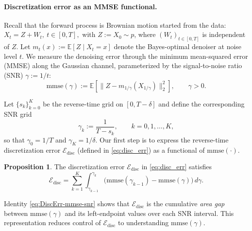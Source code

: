 \documentclass[11pt]{article}
\theoremstyle{definition}
\newtheorem{proposition}{Proposition}
\newcommand{\E}{\mathbb{E}}
\numberwithin{equation}{section}
\begin{document}





\paragraph{Discretization error as an MMSE functional.}
Recall that the forward process is Brownian motion started from the data:
\(
X_t = Z + W_t,\ t\in[0,T],
\)
with $Z:=X_0\sim p$, where $(W_t)_{t\in[0,T]}$ is independent of $Z$. 
Let
\(
m_t(x) := \E[Z\mid X_t=x]
\)
denote the Bayes-optimal denoiser at noise level $t$.
We measure the denoising error through the minimum mean-squared error (MMSE) along the Gaussian channel,
parameterized by the signal-to-noise ratio (SNR) $\gamma := 1/t$:
\begin{equation*}
\mathrm{mmse}(\gamma) := \E\!\left[\|Z - m_{1/\gamma}(X_{1/\gamma})\|_2^2\right],\qquad \gamma>0.
\end{equation*}

Let $\{s_k\}_{k=0}^K$ be the reverse-time grid on $[0,T-\delta]$ and define the corresponding SNR grid
\begin{equation*}
\gamma_k := \frac{1}{T-s_k},\qquad k=0,1,\dots,K,
\end{equation*}
so that $\gamma_0=1/T$ and $\gamma_K = 1/\delta$.
Our first step is to express the reverse-time discretization error $\mathcal E_{\mathrm{disc}}$ (defined in \eqref{eq:disc_err})
as a functional of $\mathrm{mmse}(\cdot)$.

\begin{proposition}\label{thm:disc-mmse}
The discretization error $\mathcal E_{\mathrm{disc}}$ in \eqref{eq:disc_err} satisfies
\begin{equation}\label{eq:DiscErr-mmse-snr}
\mathcal E_{\mathrm{disc}}
=
\sum_{k=1}^K
\int_{\gamma_{k-1}}^{\gamma_k}
\big(\mathrm{mmse}(\gamma_{k-1})-\mathrm{mmse}(\gamma)\big)\,d\gamma.
\end{equation}
\end{proposition}

Identity \eqref{eq:DiscErr-mmse-snr} shows that $\mathcal E_{\mathrm{disc}}$ is the cumulative \emph{area gap}
between $\mathrm{mmse}(\gamma)$ and its left-endpoint values over each SNR interval. This representation reduces control of $\mathcal E_{\mathrm{disc}}$ to understanding $\mathrm{mmse}(\gamma)$.
\end{document}
